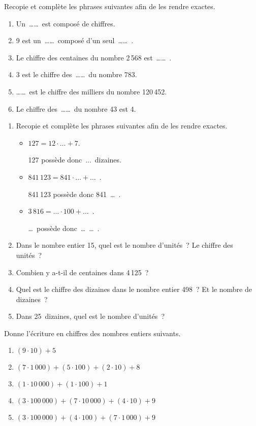 

\begin{exercice}
Recopie et complète les phrases suivantes afin de les rendre exactes.
\begin{enumerate}
 \item Un …… est composé de chiffres.
 \item 9 est un …… composé d'un seul …… .
 \item Le chiffre des centaines du nombre 2\,568 est …… .
 \item 3 est le chiffre des …… du nombre 783.
 \item …… est le chiffre des milliers du nombre 120\,452.
 \item Le chiffre des …… du nombre 43 est 4.
\end{enumerate}
\end{exercice}


\begin{exercice}
\begin{enumerate}
 \item Recopie et complète les phrases suivantes afin de les rendre exactes.
 \begin{itemize}
  \item $127 = 12 \cdot \ldots + 7$.
  
  127 possède donc ... dizaines.
  \item $841\,123 = 841 \cdot \ldots + \ldots$ .
  
  841\,123 possède donc 841 \ldots .
  \item $3\,816 = \ldots \cdot 100 + \ldots$ .
  
  \ldots possède donc \ldots \ldots .
  \end{itemize}
 \item Dans le nombre entier 15, quel est le nombre d'unités ? Le chiffre des unités ?
 \item Combien y a-t-il de centaines dans 4\,125 ?
 \item Quel est le chiffre des dizaines dans le nombre entier 498 ? Et le nombre de dizaines ?
 \item Dans 25 dizaines, quel est le nombre d'unités ?
 \end{enumerate}
\end{exercice}


\begin{exercice}
Donne l'écriture en chiffres des nombres entiers suivants.
\begin{enumerate}
 \item $(9 \cdot 10) + 5$
 \item $(7 \cdot 1\,000) + (5 \cdot 100) + (2 \cdot 10) + 8$
 \item $(1 \cdot 10\,000) + (1 \cdot 100) + 1$
 \item  $(3 \cdot 100\,000) + (7 \cdot 10\,000) + (4 \cdot 10) + 9$
 \item  $(3 \cdot 100\,000) + (4 \cdot 100) + (7 \cdot 1\,000) + 9$
 \end{enumerate}
\end{exercice}


